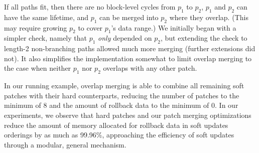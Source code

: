 \noindent
%
If all paths fit, then there are no block-level cycles from $p_1$
to $p_2$, $p_1$ and $p_2$ can have the same lifetime, and $p_1$ can be
merged into $p_2$ where they overlap.
%
(This may require growing $p_2$ to cover $p_1$'s data range.)
%
We initially began with a simpler check, namely that $p_1$ \emph{only}
depended on $p_2$, but extending the check to length-2 non-branching paths
allowed much more merging (further extensions did not).
%
It also simplifies the implementation somewhat to limit overlap merging to
the case when neither $p_1$ nor $p_2$ overlaps with any other patch.



In our running example, overlap merging is able to combine all remaining
soft patches with their hard counterparts, reducing the number of patches
to the minimum of 8 and the amount of rollback data to the minimum of 0.
%
In our experiments, we observe that hard patches and our patch merging
optimizations reduce the amount of memory allocated for rollback data in
soft updates orderings by as much as 99.96\%, approaching the efficiency
of soft updates through a modular, general mechanism.


\begin{comment}
%
If the only dependency between $p_1$ and $p_2$ is direct---that is, no path
$p_1 \PDepend x \PDepend p_2$ exists for any $x \not\in \{p_1,
p_2\}$---then it will always be possible to write $p_1$ and $p_2$ at the
same time.
%
Specifically, it is possible to write $p_1$ 


Many of these and similar \chdescs\ are mergeable and have
dependencies that allow simple (and fast) reasoning to identify many
of the mergeable pairs: two \chdescs\ on block $b$ that overlap no other \chdescs\ in \PMem[b]
and which have no dependency path from the new to the existing \chdesc\
will not induce a block-level cycle and so are writable together.
We know that \textit{later} changes will not cause them to induce a block-level cycle due to
invariant~\ref{cdinvar:add-before} and by not merging if the new \chdesc\
has a before and the before is marked as allowed to violate
invariant~\ref{cdinvar:add-before}.
%
While path existence testing is expensive, a conservative path test
of only a depth of two identifies most mergeable \chdescs. If the new
\chdesc\ has an explicit \before\ that is not the existing \chdesc\ and
this \before\ has a \before, then there may be a path to the existing
\chdesc.
%
To merge two such overlapping \chdescs, add the new \chdesc's explicit
before to the existing \chdesc\ (if any and if not the existing \chdesc).



At the end of \chdesc\ optimizations, say something along the lines:
%
The dynamic optimizations facilitated through \nrb\
\chdescs\ implement the efficiency in systems using soft updates or
journaling\todo{Actually do this for journaling} while expressing
changes modularly through structural descriptions rather than through
internal and semantic file system descriptions.

\todo{Should we talk about why we allow NRBs and merging to be
  disabled? (Debugging simplicity and depend add to \noop\ \chdescs\
  with \afters\ bug catching.)}
\end{comment}
